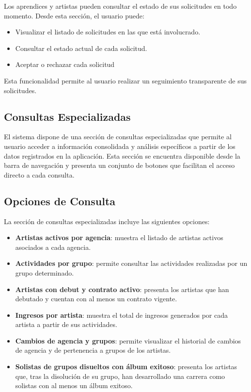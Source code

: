 \documentclass[12pt,a4paper,spanish,oneside]{article}
\begin{document}
	Los aprendices y artistas pueden consultar el estado de sus solicitudes en todo momento. Desde esta sección, el usuario puede:
	
	\begin{itemize}
		\item Visualizar el listado de solicitudes en las que está involucrado.
		\item Consultar el estado actual de cada solicitud.
		\item Aceptar o rechazar cada solicitud
	\end{itemize}
	
	Esta funcionalidad permite al usuario realizar un seguimiento transparente de sus solicitudes.
	
	\subsection{Consultas Especializadas}
	
	El sistema dispone de una sección de consultas especializadas que permite al usuario acceder a información consolidada y análisis específicos a partir de los datos registrados en la aplicación. Esta sección se encuentra disponible desde la barra de navegación y presenta un conjunto de botones que facilitan el acceso directo a cada consulta.
	
	\subsection{Opciones de Consulta}
	
	La sección de consultas especializadas incluye las siguientes opciones:
	
	\begin{itemize}
		\item \textbf{Artistas activos por agencia}: muestra el listado de artistas activos asociados a cada agencia.
		\item \textbf{Actividades por grupo}: permite consultar las actividades realizadas por un grupo determinado.
		\item \textbf{Artistas con debut y contrato activo}: presenta los artistas que han debutado y cuentan con al menos un contrato vigente.
		\item \textbf{Ingresos por artista}: muestra el total de ingresos generados por cada artista a partir de sus actividades.
		\item \textbf{Cambios de agencia y grupos}: permite visualizar el historial de cambios de agencia y de pertenencia a grupos de los artistas.
		\item \textbf{Solistas de grupos disueltos con álbum exitoso}: presenta los artistas que, tras la disolución de su grupo, han desarrollado una carrera como solistas con al menos un álbum exitoso.
	\end{itemize}
	
\end{document}
